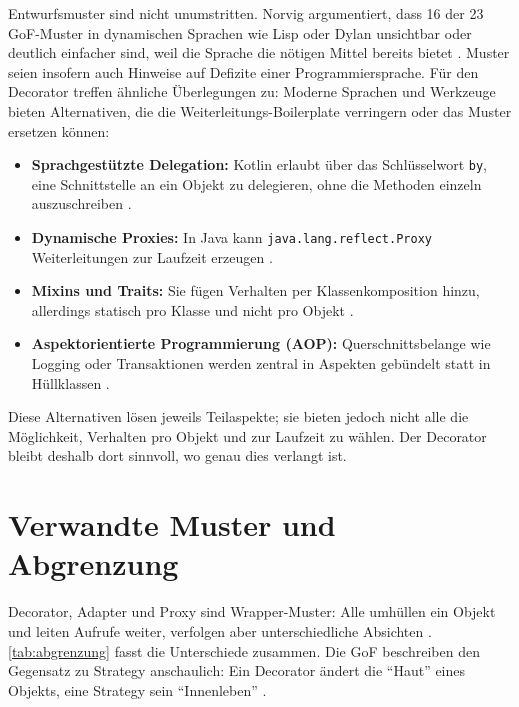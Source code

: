 \documentclass[a4paper,11pt,toc=listof,toc=bibliography]{scrartcl}
\begin{document}
Entwurfsmuster sind nicht unumstritten. Norvig argumentiert, dass 16 der 23 \acs{GoF}-Muster in dynamischen Sprachen wie Lisp oder Dylan unsichtbar oder deutlich einfacher sind, weil die Sprache die nötigen Mittel bereits bietet \cite{Nor96}. Muster seien insofern auch Hinweise auf Defizite einer Programmiersprache. Für den Decorator treffen ähnliche Überlegungen zu: Moderne Sprachen und Werkzeuge bieten Alternativen, die die Weiterleitungs-Boilerplate verringern oder das Muster ersetzen können:
\begin{itemize}
  \item \textbf{Sprachgestützte Delegation:} Kotlin erlaubt über das Schlüsselwort \texttt{by}, eine Schnittstelle an ein Objekt zu delegieren, ohne die Methoden einzeln auszuschreiben \cite{KOTLIN}.
  \item \textbf{Dynamische Proxies:} In Java kann \texttt{java.lang.reflect.Proxy} Weiterleitungen zur Laufzeit erzeugen \cite{ORA-PROXY}.
  \item \textbf{Mixins und Traits:} Sie fügen Verhalten per Klassenkomposition hinzu, allerdings statisch pro Klasse und nicht pro Objekt \cite{BC90}.
  \item \textbf{Aspektorientierte Programmierung (\acs{AOP}):} Querschnittsbelange wie Logging oder Transaktionen werden zentral in Aspekten gebündelt statt in Hüllklassen \cite{Kic97}.
\end{itemize}
Diese Alternativen lösen jeweils Teilaspekte; sie bieten jedoch nicht alle die Möglichkeit, Verhalten pro Objekt und zur Laufzeit zu wählen. Der Decorator bleibt deshalb dort sinnvoll, wo genau dies verlangt ist.

\section{Verwandte Muster und Abgrenzung}
\label{sec:verwandt}

Decorator, Adapter und Proxy sind Wrapper-Muster: Alle umhüllen ein Objekt und leiten Aufrufe weiter, verfolgen aber unterschiedliche Absichten \cite{GHJV94}. \autoref{tab:abgrenzung} fasst die Unterschiede zusammen. Die \acs{GoF} beschreiben den Gegensatz zu Strategy anschaulich: Ein Decorator ändert die \enquote{Haut} eines Objekts, eine Strategy sein \enquote{Innenleben} \cite{GHJV94}.
\end{document}
